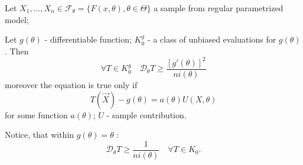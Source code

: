 \begin{theorem}
    Let $X_1, \ldots, X_n \in \mathcal{F}_{\theta} = \{ F(x, \theta),
    \theta \in \Theta\}$ a sample from regular parametrized
    model;

    Let $g(\theta)$ - differentiable function; $K_{0}^{g}$ - 
    a class of unbiased evaluations for $g(\theta)$.
    Then
    \begin{equation}
    \forall T \in K_{0}^{g} \quad \mathcal{D}_{\theta} T
    \geq \frac{\left[ g'(\theta) \right] ^2}{n i (\theta)}
    \end{equation}
    moreover the equation is true only if
    \[
    T(\vec{X}) - g(\theta) = a(\theta) U(X, \theta)
    \] 
    for some function $a(\theta )$; $U$ - sample contribution.

    Notice, that within  $g(\theta) = \theta$ :
    \[
    \mathcal{D}_{\theta}T \geq \frac{1}{n i(\theta)} \quad
    \forall T \in K_{0}
    .\] 
\end{theorem}

